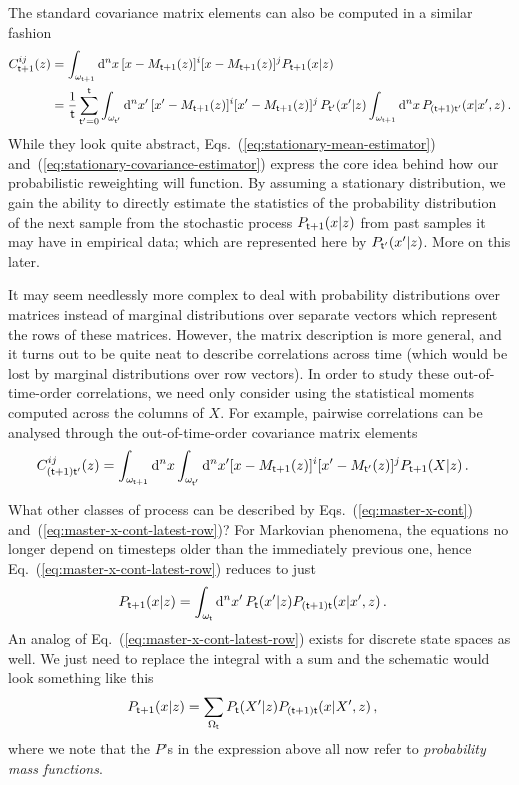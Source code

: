The standard covariance matrix elements can also be computed in a similar fashion
\begin{align}
C^{ij}_{{\sf t}+1}(z) &= \int_{\omega_{{\sf t}+1}}{\rm d}^nx \,[x-M_{{\sf t}+1}(z)
]^i[x-M_{{\sf t}+1}(z)]^jP_{{\sf t}+1}(x\vert z) \nonumber \\
&= \frac{1}{{\sf t}}\sum_{{\sf t}'=0}^{{\sf t}}\int_{\omega_{{\sf t}'}}{\rm d}^nx' \, [x'-M_{{\sf t}+1}(z)]^i[x'-M_{{\sf t}+1}(z)]^j \,P_{{\sf t}'}(x'\vert z) \int_{\omega_{{\sf t}+1}}{\rm d}^nx \, P_{({\sf t}+1){\sf t}'}(x\vert x',z) \label{eq:stationary-covariance-estimator}\,.
\end{align}
While they look quite abstract, Eqs.~(\ref{eq:stationary-mean-estimator}) and~(\ref{eq:stationary-covariance-estimator}) express the core idea behind how our probabilistic reweighting will function. By assuming a stationary distribution, we gain the ability to directly estimate the statistics of the probability distribution of the next sample from the stochastic process $P_{{\sf t}+1}(x\vert z)$ from past samples it may have in empirical data; which are represented here by $P_{{\sf t}'}(x'\vert z)$. More on this later.

It may seem needlessly more complex to deal with probability distributions over matrices instead of marginal distributions over separate vectors which represent the rows of these matrices. However, the matrix description is more general, and it turns out to be quite neat to describe correlations across time (which would be lost by marginal distributions over row vectors). In order to study these out-of-time-order correlations, we need only consider using the statistical moments computed across the columns of $X$. For example, pairwise correlations can be analysed through the out-of-time-order covariance matrix elements
\begin{align}
C_{({\sf t}+1){\sf t}'}^{ij}(z) &= \int_{\omega_{{\sf t}+1}}{\rm d}^nx\int_{\omega_{{\sf t}'}}{\rm d}^nx' [x-M_{{\sf t}+1}(z)
]^i[x'-M_{{\sf t}'}(z)]^jP_{{\sf t}+1}(X\vert z) \label{eq:out-of-time-order-covariance-estimator} \,.
\end{align}

What other classes of process can be described by Eqs.~(\ref{eq:master-x-cont}) and~(\ref{eq:master-x-cont-latest-row})? For Markovian phenomena, the equations no longer depend on timesteps older than the immediately previous one, hence Eq.~(\ref{eq:master-x-cont-latest-row}) reduces to just
\begin{align}
P_{{\sf t}+1}(x\vert z) &= \int_{\omega_{\sf t}}{\rm d}^nx' \, P_{\sf t}(x'\vert z) P_{({\sf t}+1){\sf t}}(x\vert x',z) \label{eq:master-x-cont-markov} \,.
\end{align}
An analog of Eq.~(\ref{eq:master-x-cont-latest-row}) exists for discrete state spaces as well. We just need to replace the integral with a sum and the schematic would look something like this
\begin{align}
P_{{\sf t}+1}(x\vert z) &= \sum_{\Omega_{{\sf t}}} P_{{\sf t}}(X'\vert z) P_{({\sf t}+1){\sf t}}(x \vert X', z) \label{eq:master-x-disc} \,,
\end{align}
where we note that the $P$'s in the expression above all now refer to \emph{probability mass functions}.

